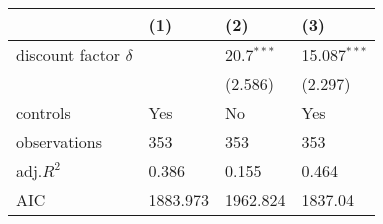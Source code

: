 \begin{tabular}{llll}
\hline
 & (1) & (2) & (3) \\
\hline
discount factor $\delta$ &  & 20.7$^{***}$ & 15.087$^{***}$ \\
 &  & (2.586) & (2.297) \\
controls & Yes & No & Yes \\
observations & 353 & 353 & 353 \\
adj.$R^2$ & 0.386 & 0.155 & 0.464 \\
AIC & 1883.973 & 1962.824 & 1837.04 \\
\hline
\end{tabular}
